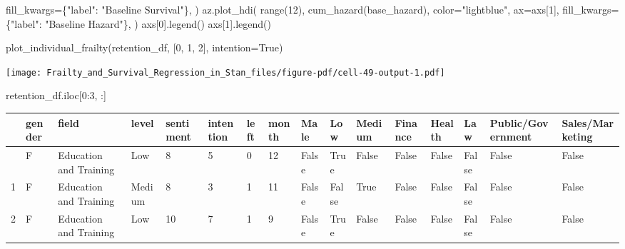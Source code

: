 \documentclass[
  letterpaper,
  DIV=11,
  numbers=noendperiod]{scrartcl}
\newenvironment{Shaded}{\begin{snugshade}}{\end{snugshade}}
\newcommand{\BuiltInTok}[1]{\textcolor[rgb]{0.00,0.23,0.31}{#1}}
\newcommand{\DecValTok}[1]{\textcolor[rgb]{0.68,0.00,0.00}{#1}}
\newcommand{\NormalTok}[1]{\textcolor[rgb]{0.00,0.23,0.31}{#1}}
\newcommand{\OperatorTok}[1]{\textcolor[rgb]{0.37,0.37,0.37}{#1}}
\newcommand{\StringTok}[1]{\textcolor[rgb]{0.13,0.47,0.30}{#1}}
\newcommand{\VariableTok}[1]{\textcolor[rgb]{0.07,0.07,0.07}{#1}}
\begin{document}
\begin{Shaded}
\begin{Highlighting}[]
\NormalTok{        fill\_kwargs}\OperatorTok{=}\NormalTok{\{}\StringTok{"label"}\NormalTok{: }\StringTok{"Baseline Survival"}\NormalTok{\},}
\NormalTok{    )}
\NormalTok{    az.plot\_hdi(}
        \BuiltInTok{range}\NormalTok{(}\DecValTok{12}\NormalTok{),}
\NormalTok{        cum\_hazard(base\_hazard),}
\NormalTok{        color}\OperatorTok{=}\StringTok{"lightblue"}\NormalTok{,}
\NormalTok{        ax}\OperatorTok{=}\NormalTok{axs[}\DecValTok{1}\NormalTok{],}
\NormalTok{        fill\_kwargs}\OperatorTok{=}\NormalTok{\{}\StringTok{"label"}\NormalTok{: }\StringTok{"Baseline Hazard"}\NormalTok{\},}
\NormalTok{    )}
\NormalTok{    axs[}\DecValTok{0}\NormalTok{].legend()}
\NormalTok{    axs[}\DecValTok{1}\NormalTok{].legend()}


\NormalTok{plot\_individual\_frailty(retention\_df, [}\DecValTok{0}\NormalTok{, }\DecValTok{1}\NormalTok{, }\DecValTok{2}\NormalTok{], intention}\OperatorTok{=}\VariableTok{True}\NormalTok{)}
\end{Highlighting}
\end{Shaded}

\texttt{[image: Frailty\_and\_Survival\_Regression\_in\_Stan\_files/figure-pdf/cell-49-output-1.pdf]}

\begin{Shaded}
\begin{Highlighting}[]
\NormalTok{retention\_df.iloc[}\DecValTok{0}\NormalTok{:}\DecValTok{3}\NormalTok{, :]}
\end{Highlighting}
\end{Shaded}

\begin{longtable}[]{@{}llllllllllllllll@{}}
\toprule\noalign{}
& gender & field & level & sentiment & intention & left & month & Male &
Low & Medium & Finance & Health & Law & Public/Government &
Sales/Marketing \\
\midrule\noalign{}
\endhead
\bottomrule\noalign{}
\endlastfoot
0 & F & Education and Training & Low & 8 & 5 & 0 & 12 & False & True &
False & False & False & False & False & False \\
1 & F & Education and Training & Medium & 8 & 3 & 1 & 11 & False & False
& True & False & False & False & False & False \\
2 & F & Education and Training & Low & 10 & 7 & 1 & 9 & False & True &
False & False & False & False & False & False \\
\end{longtable}
\end{document}
